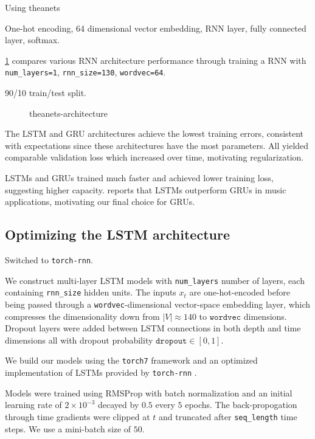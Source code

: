 Using theanets

One-hot encoding, 64 dimensional vector embedding, RNN layer, fully connected layer, softmax.

\cref{fig:theanets-architecture} compares various RNN architecture performance
through training a RNN with \texttt{num\_layers=1}, \texttt{rnn\_size=130},
\texttt{wordvec=64}.

90/10 train/test split.

\begin{figure}[tb]
    \centering
    
    \caption{theanets-architecture}
    \label{fig:theanets-architecture}
\end{figure}

The LSTM and GRU architectures achieve the lowest training errors, consistent with expectations
since these architectures have the most parameters.
All yielded comparable validation loss which increased over time, motivating regularization.

LSTMs and GRUs trained much faster and achieved lower training loss, suggesting higher capacity.
\citep{Nayebi2015} reports that LSTMs outperform GRUs in music applications, motivating
our final choice for GRUs.

\subsection{Optimizing the LSTM architecture}
\label{sec:lstm-grid-search}

Switched to \texttt{torch-rnn}. 

We construct multi-layer LSTM models with \texttt{num\_layers} number of
layers, each containing \texttt{rnn\_size} hidden units. The inputs $x_t$ are
one-hot-encoded before being passed through a \texttt{wordvec}-dimensional
vector-space embedding layer, which compresses the dimensionality down from
$|V| \approx 140$ to $\texttt{wordvec}$ dimensions. Dropout layers were added
between LSTM connections in both depth and time dimensions all with dropout
probability $\texttt{dropout} \in [0,1]$.

We build our models using the \texttt{torch7} framework and
an optimized implementation of LSTMs provided by \texttt{torch-rnn} .

Models were trained using RMSProp  with batch normalization 
and an initial learning rate of $2 \times 10^{-3}$ decayed by $0.5$ every $5$
epochs. The back-propogation through time gradients were clipped
at $t$  and truncated after \texttt{seq\_length} time steps.
We use a mini-batch size of $50$.


